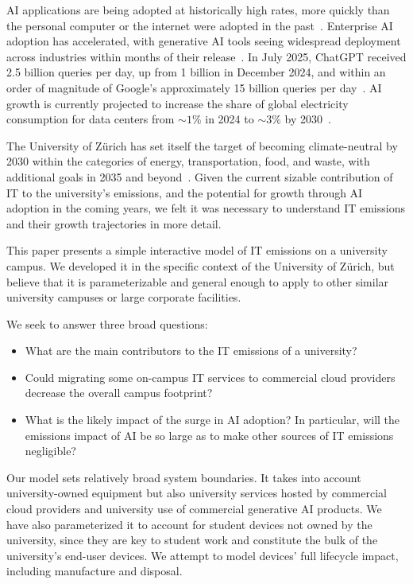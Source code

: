 \documentclass[11pt]{article}
\begin{document}
AI applications are being adopted at historically high rates, more quickly than the personal computer or the internet were adopted in the past~\cite{bick:ai:adoption}. Enterprise AI adoption has accelerated, with generative AI tools seeing widespread deployment across industries within months of their release~\cite{mckinsey2024ai}. In July 2025, ChatGPT received 2.5 billion queries per day, up from 1 billion in December 2024, and within an order of magnitude of Google's approximately 15 billion queries per day~\cite{techcrunch:chatgpt}. AI growth is currently projected to increase the share of global electricity consumption for data centers from $\sim 1\%$ in 2024 to $\sim 3\%$ by 2030~\cite{iea:ai:energy}.

The University of Zürich has set itself the target of becoming climate-neutral by 2030 within the categories of energy, transportation, food, and waste, with additional goals in 2035 and beyond~\cite{uzh:sustainability:report}. Given the current sizable contribution of IT to the university's emissions, and the potential for growth through AI adoption in the coming years, we felt it was necessary to understand IT emissions and their growth trajectories in more detail.

This paper presents a simple interactive model of IT emissions on a university campus. We developed it in the specific context of the University of Zürich, but believe that it is parameterizable and general enough to apply to other similar university campuses or large corporate facilities.

We seek to answer three broad questions:
\begin{itemize}
  \item What are the main contributors to the IT emissions of a university?
  \item Could migrating some on-campus IT services to commercial cloud providers decrease the overall campus footprint?
  \item What is the likely impact of the surge in AI adoption? In particular, will the emissions impact of AI be so large as to make other sources of IT emissions negligible?
\end{itemize}

Our model sets relatively broad system boundaries. It takes into account university-owned equipment but also university services hosted by commercial cloud providers and university use of commercial generative AI products. We have also parameterized it to account for student devices not owned by the university, since they are key to student work and constitute the bulk of the university's end-user devices. We attempt to model devices' full lifecycle impact, including manufacture and disposal. 
\end{document}

